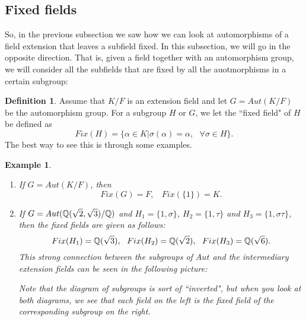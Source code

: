 \documentclass[12pt]{article}
\theoremstyle{plain}
\newtheorem{example}{Example}
\theoremstyle{definition}
\newtheorem{definition}{Definition}
\theoremstyle{remark}
\begin{document}
\subsection{Fixed fields} So, in the previous subsection we saw how we can look at automorphisms of a field extension that leaves a subfield fixed. In this subsection, we will go in the opposite direction. That is, given a field together with an automorphism group, we will consider all the subfields that are fixed by all the auotmorphisms in a certain subgroup:
\begin{definition}
 Assume that $K/F$ is an extension field and let $G=Aut(K/F)$ be the automorphism group. For a subgroup $H$ or $G$, we let the ``fixed field" of $H$ be defined as
 $$Fix(H) = \{\alpha\in K|\sigma(\alpha)=\alpha, \:\:\:\forall \sigma \in H\}.$$
 The best way to see this is through some examples.
 \begin{example}
 \begin{enumerate}
     \item If $G = Aut(K/F)$, then 
     $$Fix(G) = F, \:\:\:\: Fix(\{\mathfrak{1}\})=K.$$
     \item If $G = Aut(\mathbb{Q}(\sqrt{2},\sqrt{3})/\mathbb{Q})$ and $H_1 = \{\mathfrak{1}, \sigma\}$, $H_2 = \{\mathfrak{1}, \tau\}$ and $H_3=\{\mathfrak{1}, \sigma \tau\}$, then the fixed fields are given as follows:
     $$Fix(H_1) = \mathbb{Q}(\sqrt{3}), \:\:\: Fix(H_2) = \mathbb{Q}(\sqrt{2}), \:\:\: Fix(H_3)=\mathbb{Q}(\sqrt{6}).$$
    This strong connection between the subgroups of $Aut$ and the intermediary extension fields can be seen in the following picture: 
    

Note that the diagram of subgroups is sort of ``inverted", but when you look at both diagrams, we see that each field on the left is the fixed field of the corresponding subgroup on the right. 
\end{enumerate}
\end{example}
\end{definition}
\end{document}
